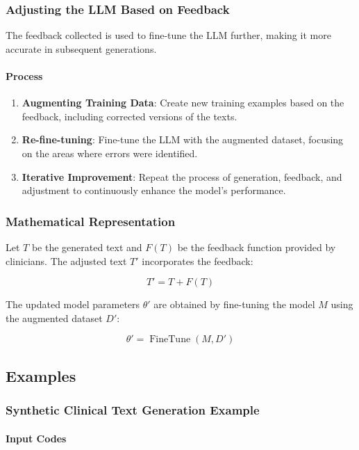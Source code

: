 \documentclass[12pt, a4paper]{article}
\begin{document}
\subsubsection{Adjusting the LLM Based on Feedback}

The feedback collected is used to fine-tune the LLM further, making it more accurate in subsequent generations.

\paragraph{Process}

\begin{enumerate}
    \item \textbf{Augmenting Training Data}: Create new training examples based on the feedback, including corrected versions of the texts.
    \item \textbf{Re-fine-tuning}: Fine-tune the LLM with the augmented dataset, focusing on the areas where errors were identified.
    \item \textbf{Iterative Improvement}: Repeat the process of generation, feedback, and adjustment to continuously enhance the model's performance.
\end{enumerate}

\subsubsection{Mathematical Representation}

Let \( T \) be the generated text and \( F(T) \) be the feedback function provided by clinicians. The adjusted text \( T' \) incorporates the feedback:

\[
T' = T + F(T)
\]

The updated model parameters \( \theta' \) are obtained by fine-tuning the model \( M \) using the augmented dataset \( D' \):

\[
\theta' = \operatorname{FineTune}(M, D')
\]

\subsection{Examples}

\subsubsection{Synthetic Clinical Text Generation Example}

\paragraph{Input Codes}
\end{document}
